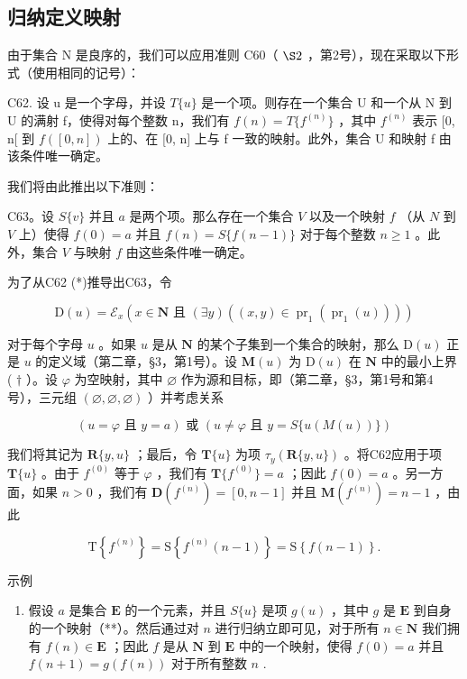 \subsection{归纳定义映射}

由于集合 N 是良序的，我们可以应用准则 C60（ \(\S2\) ，第2号），现在采取以下形式（使用相同的记号）：

C62. 设 u 是一个字母，并设 \(T\{u\}\) 是一个项。则存在一个集合 U 和一个从 N 到 U 的满射 f，使得对每个整数 n，我们有 \(f(n)=T\{f^{(n)}\}\) ，其中 \(f^{(n)}\) 表示 {[}0, n{[} 到 \(f([0, n])\) 上的、在 {[}0, n{]} 上与 f 一致的映射。此外，集合 U 和映射 f 由该条件唯一确定。

我们将由此推出以下准则：

C63。设 \(S\{v\}\) 并且 \(a\) 是两个项。那么存在一个集合 \(V\) 以及一个映射 \(f\) （从 \(N\) 到 \(V\) 上）使得 \(f(0) = a\) 并且 \(f(n) = S\{f(n-1)\}\) 对于每个整数 \(n \geqslant 1\) 。此外，集合 \(V\) 与映射 \(f\) 由这些条件唯一确定。

为了从C62 (*)推导出C63，令

\[
\mathrm{D} (u) = \mathcal {E} _ {x} (x \in \mathbf {N} \text {   且   } (\exists y) ((x, y) \in \operatorname{pr} _ {1} (\operatorname{pr} _ {1} (u))))
\]

对于每个字母 \(u\) 。如果 \(u\) 是从 \(\mathbf{N}\) 的某个子集到一个集合的映射，那么 \(\mathrm{D}(u)\) 正是 \(u\) 的定义域（第二章，§3，第1号）。设 \(\mathbf{M}(u)\) 为 \(\mathrm{D}(u)\) 在 \(\mathbf{N}\) 中的最小上界 ( \(\dagger\) ）。设 \(\varphi\) 为空映射，其中 \(\varnothing\) 作为源和目标，即（第二章，§3，第1号和第4号），三元组 \((\varnothing, \varnothing, \varnothing)\) ）并考虑关系

\[
(u = \varphi \text {   且   } y = a) \text {   或   } (u \neq \varphi \text {   且   } y = S \{u (M (u)) \})
\]

我们将其记为 \(\mathbf{R}\{y,u\}\) ；最后，令 \(\mathbf{T}\{u\}\) 为项 \(\tau_{y}(\mathbf{R}\{y,u\})\) 。将C62应用于项 \(\mathbf{T}\{u\}\) 。由于 \(f^{(0)}\) 等于 \(\varphi\) ，我们有 \(\mathbf{T}\{f^{(0)}\}=a\) ；因此 \(f(0)=a\) 。另一方面，如果 \(n>0\) ，我们有 \(\mathbf{D}(f^{(n)})=[0,n-1]\) 并且 \(\mathbf{M}(f^{(n)})=n-1\) ，由此

\[
\mathrm{T} \left\{f ^ {(n)} \right\} = \mathrm{S} \left\{f ^ {(n)} (n - 1) \right\} = \mathrm{S} \left\{f (n - 1) \right\}.
\]

示例

\begin{enumerate}
\def\labelenumi{(\arabic{enumi})}
\tightlist
\item
  假设 \(a\) 是集合 \(\mathbf{E}\) 的一个元素，并且 \(S\{u\}\) 是项 \(g(u)\) ，其中 \(g\) 是 \(\mathbf{E}\) 到自身的一个映射（**）。然后通过对 \(n\) 进行归纳立即可见，对于所有 \(n \in \mathbf{N}\) 我们拥有 \(f(n) \in \mathbf{E}\) ；因此 \(f\) 是从 \(\mathbf{N}\) 到 \(\mathbf{E}\) 中的一个映射，使得 \(f(0) = a\) 并且 \(f(n + 1) = g(f(n))\) 对于所有整数 \(n\) .
\end{enumerate}


